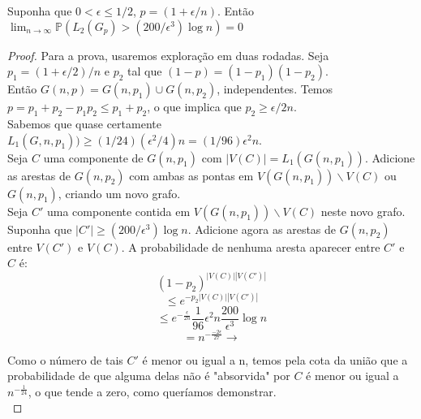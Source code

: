 \documentclass[a4paper,12pt]{article}
\begin{document}
\begin{teorema}
Suponha que $0<\epsilon\leq1/2$, $p=(1+\epsilon/n)$. Então $\lim_{n\to\infty} \mathbb{P}(L_2(G_p)>(200/\epsilon^3)\log n)=0$
\end{teorema}
\begin{proof}
Para a prova, usaremos exploração em duas rodadas. Seja $p_1 = (1+\epsilon/2)/n$ e $p_2$ tal que $(1-p)=(1-p_1)(1-p_2)$.\\

Então $G(n,p)=G(n,p_1)\cup G(n,p_2)$, independentes. Temos $p=p_1+p_2-p_1p_2\leq p_1+p_2$, o que implica que  $p_2\geq\epsilon/2n$.\\

Sabemos que quase certamente $L_1(G,n,p_1))\geq(1/24)(\epsilon^2/4)n = (1/96)\epsilon^2n$.\\

Seja $C$ uma componente de $G(n,p_1)$ com $|V(C)|=L_1(G(n,p_1))$. Adicione as arestas de $G(n,p_2)$ com ambas as pontas em $V(G(n,p_1))\backslash V(C)$ ou $G(n,p_1)$, criando um novo grafo.\\ 

Seja $C'$ uma componente contida em $V(G(n,p_1))\backslash V(C)$ neste novo grafo.
Suponha que $|C'|\geq (200/\epsilon^3)\log n$. Adicione agora as arestas de $G(n,p_2)$ entre $V(C')$ e $V(C)$. A probabilidade de nenhuma aresta aparecer entre $C'$ e $C$ é:\\
\[(1-p_2)^{|V(C)||V(C')|}\]
\[\leq e^{-p_2|V(C)||V(C')|}\]
\[\leq  e^{-\frac{\epsilon}{2n}}\frac{1}{96}\epsilon^2 n \frac{200}{\epsilon^3}\log n\]
\[=n^{-\frac{-2\epsilon}{27}}\rightarrow\]

Como o número de tais $C'$ é menor ou igual a n, temos pela cota da união que a probabilidade de que alguma delas não é "absorvida" por $C$ é menor ou igual a $n^{-\frac{1}{24}}$, o que tende a zero, como queríamos demonstrar.\\

\end{proof}
\end{document}

